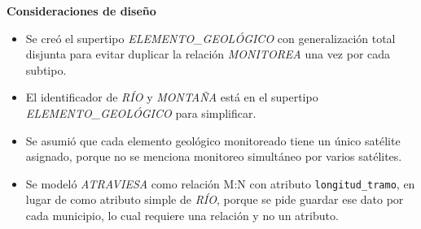 \textbf{Consideraciones de diseño}

\begin{itemize}
    \item Se creó el supertipo \textit{ELEMENTO\_GEOLÓGICO} con generalización total disjunta para evitar duplicar la relación \textit{MONITOREA} una vez por cada subtipo.
    \item El identificador de \textit{RÍO} y \textit{MONTAÑA} está en el supertipo \textit{ELEMENTO\_GEOLÓGICO} para simplificar.
    \item Se asumió que cada elemento geológico monitoreado tiene un único satélite asignado, porque no se menciona monitoreo simultáneo por varios satélites.
    \item Se modeló \textit{ATRAVIESA} como relación M:N con atributo \texttt{longitud\_tramo}, en lugar de como atributo simple de \textit{RÍO}, porque se pide guardar ese dato por cada municipio, lo cual requiere una relación y no un atributo.
\end{itemize}